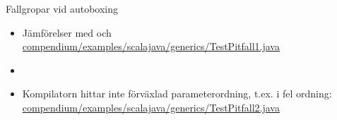 \begin{Slide}{Fallgropar vid autoboxing}
\begin{itemize}
\item Jämförelser med \code{==} och \code{!=} \\
\href{https://github.com/lunduniversity/introprog/blob/master/compendium/examples/scalajava/generics/TestPitfall1.java}
{\SlideFontSmall  compendium/examples/scalajava/generics/TestPitfall1.java}
\item[]
\item Kompilatorn hittar inte förväxlad parameterordning, t.ex.  i fel ordning: \sout{}\\
\href{https://github.com/lunduniversity/introprog/blob/master/compendium/examples/scalajava/generics/TestPitfall2.java}
{\SlideFontSmall compendium/examples/scalajava/generics/TestPitfall2.java}
\end{itemize}
\end{Slide}


